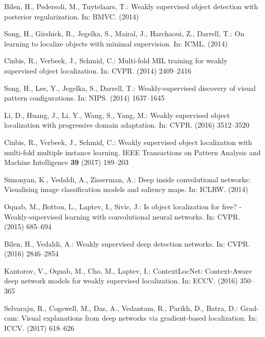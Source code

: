 \documentclass[runningheads]{llncs}
\begin{document}
\begin{thebibliography}{10}
Bilen, H., Pedersoli, M., Tuytelaars, T.:
\newblock Weakly supervised object detection with posterior regularization.
\newblock In: BMVC. (2014)

Song, H., Girshick, R., Jegelka, S., Mairal, J., Harchaoui, Z., Darrell, T.:
\newblock On learning to localize objects with minimal supervision.
\newblock In: ICML. (2014)

Cinbis, R., Verbeek, J., Schmid, C.:
\newblock Multi-fold {M}{I}{L} training for weakly supervised object
  localization.
\newblock In: CVPR. (2014)  2409--2416

Song, H., Lee, Y., Jegelka, S., Darrell, T.:
\newblock Weakly-supervised discovery of visual pattern configurations.
\newblock In: NIPS. (2014)  1637--1645

Li, D., Huang, J., Li, Y., Wang, S., Yang, M.:
\newblock Weakly supervised object localization with progressive domain
  adaptation.
\newblock In: CVPR. (2016)  3512--3520

Cinbis, R., Verbeek, J., Schmid, C.:
\newblock Weakly supervised object localization with multi-fold multiple
  instance learning.
\newblock IEEE Transactions on Pattern Analysis and Machine Intelligence
  \textbf{39} (2017)  189--203

Simonyan, K., Vedaldi, A., Zisserman, A.:
\newblock Deep inside convolutional networks: Visualising image classification
  models and saliency maps.
\newblock In: ICLRW. (2014)

Oquab, M., Bottou, L., Laptev, I., Sivic, J.:
\newblock Is object localization for free? - {W}eakly-supervised learning with
  convolutional neural networks.
\newblock In: CVPR. (2015)  685--694

Bilen, H., Vedaldi, A.:
\newblock Weakly supervised deep detection networks.
\newblock In: CVPR. (2016)  2846--2854

Kantorov, V., Oquab, M., Cho, M., Laptev, I.:
\newblock Context{L}oc{N}et: Context-{A}ware deep network models for weakly
  supervised localization.
\newblock In: ECCV. (2016)  350--365

Selvaraju, R., Cogswell, M., Das, A., Vedantam, R., Parikh, D., Batra, D.:
\newblock Grad-cam: Visual explanations from deep networks via gradient-based
  localization.
\newblock In: ICCV. (2017)  618--626


\end{thebibliography}
\end{document}
